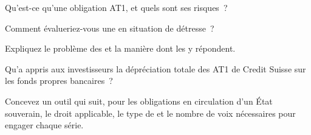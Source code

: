 \begin{interviewq}\label{iq:m2:distressed-sovereign-and-bank-capital-credit:2}
Qu'est-ce qu'une obligation AT1, et quels sont ses risques~?
\end{interviewq}

\begin{interviewq}\label{iq:m2:distressed-sovereign-and-bank-capital-credit:3}
Comment évalueriez-vous une  en situation de détresse~?
\end{interviewq}

\begin{interviewq}\label{iq:m2:distressed-sovereign-and-bank-capital-credit:4}
Expliquez le problème des  et la manière dont les  y répondent.
\end{interviewq}

\begin{interviewq}\label{iq:m2:distressed-sovereign-and-bank-capital-credit:5}
Qu'a appris aux investisseurs la dépréciation totale des AT1 de Credit Suisse sur les fonds propres bancaires~?
\end{interviewq}

\begin{interviewq}\label{iq:m2:distressed-sovereign-and-bank-capital-credit:6}
Concevez un outil qui suit, pour les obligations en circulation d'un État souverain, le droit applicable, le
type de  et le nombre de voix nécessaires pour engager chaque série.
\end{interviewq}
